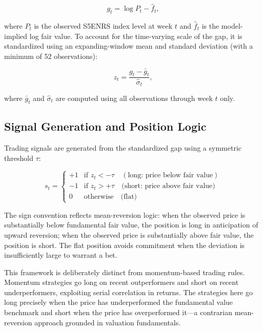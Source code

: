 \documentclass[12pt]{article}
\begin{document}
\begin{equation}
g_t = \log P_t - \hat{f}_t,
\label{eq:gap}
\end{equation}

where $P_t$ is the observed S5ENRS index level at week $t$ and $\hat{f}_t$ is the model-implied log fair value. To account for the time-varying scale of the gap, it is standardized using an expanding-window mean and standard deviation (with a minimum of 52 observations):

\begin{equation}
z_t = \frac{g_t - \bar{g}_t}{\hat{\sigma}_t},
\label{eq:zscore}
\end{equation}

where $\bar{g}_t$ and $\hat{\sigma}_t$ are computed using all observations through week $t$ only.

\subsection{Signal Generation and Position Logic}

Trading signals are generated from the standardized gap using a symmetric threshold $\tau$:

\begin{equation}
s_t =
\begin{cases}
+1 & \text{if } z_t < -\tau \quad (\text{long: price below fair value}) \\
-1 & \text{if } z_t > +\tau \quad \text{(short: price above fair value)} \\
0 & \text{otherwise} \quad \text{(flat)}
\end{cases}
\label{eq:signal}
\end{equation}

The sign convention reflects mean-reversion logic: when the observed price is substantially below fundamental fair value, the position is long in anticipation of upward reversion; when the observed price is substantially above fair value, the position is short. The flat position avoids commitment when the deviation is insufficiently large to warrant a bet.

This framework is deliberately distinct from momentum-based trading rules. Momentum strategies go long on recent outperformers and short on recent underperformers, exploiting serial correlation in returns. The strategies here go long precisely when the price has underperformed the fundamental value benchmark and short when the price has overperformed it—a contrarian mean-reversion approach grounded in valuation fundamentals.
\end{document}
